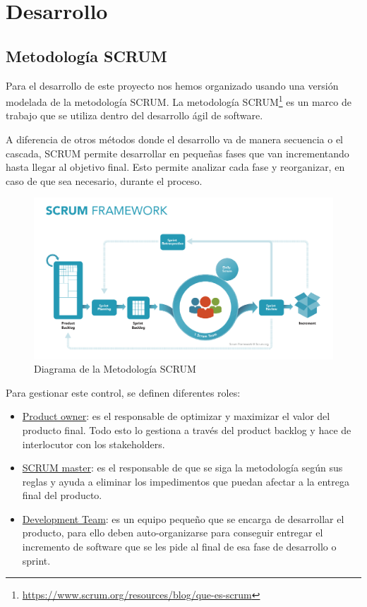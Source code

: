 \documentclass[a4paper, 12pt]{book}
\begin{document}
\cleardoublepage
\chapter{Desarrollo}
\label{sec:desarrollo} 


\section{Metodología SCRUM}
\label{sec:scrum}

Para el desarrollo de este proyecto nos hemos organizado usando una versión modelada de la metodología SCRUM\cite{sutherland:scrum}. La metodología SCRUM\footnote{\url{https://www.scrum.org/resources/blog/que-es-scrum}} es un marco de trabajo que se utiliza dentro del desarrollo ágil de software. 

A diferencia de otros métodos donde el desarrollo va de manera secuencia o el cascada, SCRUM permite desarrollar en pequeñas fases que van incrementando hasta llegar al objetivo final. Esto permite analizar cada fase y reorganizar, en caso de que sea necesario, durante el proceso. 

\begin{figure}[H]
  \centering
  \includegraphics[width=12cm, keepaspectratio]{img/development/scrum.png}
  \caption{Diagrama de la Metodología SCRUM}
  \label{fig:scrum}
\end{figure}

Para gestionar este control, se definen diferentes roles:

\begin{itemize}
    \item \underline{Product owner}: es el responsable de optimizar y maximizar el valor del producto final. Todo esto lo gestiona a través del product backlog y hace de interlocutor con los stakeholders.
    \item \underline{SCRUM master}: es el responsable de que se siga la metodología según sus reglas y ayuda a eliminar los impedimentos que puedan afectar a la entrega final del producto.
    \item \underline{Development Team}: es un equipo pequeño que se encarga de desarrollar el producto, para ello deben auto-organizarse para conseguir entregar el incremento de software que se les pide al final de esa fase de desarrollo o sprint.
\end{itemize}
\end{document}
